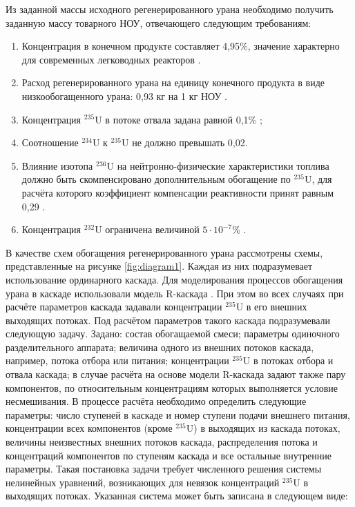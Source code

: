 Из заданной массы исходного регенерированного урана необходимо получить заданную массу товарного НОУ, отвечающего следующим требованиям:

\begin{enumerate}
  \item Концентрация в конечном продукте составляет 4,95\%, значение характерно для современных легководных реакторов \cite{solovevaCennostiOYaTKak2019}.
  \item Расход регенерированного урана на единицу конечного продукта в виде низкообогащенного урана: 0,93 кг на 1 кг НОУ \cite{smirnovApplyingEnrichmentCapacities2018}.
  \item Концентрация $^{235}$U в потоке отвала задана равной 0,1\% \cite{smirnovEvolutionIsotopicComposition2012};
  \item Соотношение $^{234}$U к $^{235}$U не должно превышать 0,02.
  \item Влияние изотопа $^{236}$U на нейтронно-физические характеристики топлива должно быть скомпенсировано дополнительным обогащение по $^{235}$U, для расчёта которого коэффициент компенсации реактивности принят равным 0,29 \cite{smirnovApplyingEnrichmentCapacities2018}.
  \item Концентрация $^{232}$U ограничена величиной $5\cdot10^{-7}$\% \cite{smirnovApplyingEnrichmentCapacities2018}.
\end{enumerate}

В качестве схем обогащения регенерированного урана рассмотрены схемы, представленные на рисунке \ref{fig:diagram1}.
Каждая из них подразумевает использование ординарного каскада. Для моделирования процессов обогащения урана в каскаде использовали модель R-каскада \cite{sulaberidzeTeoriyaKaskadovDlya2011}. При этом во всех случаях при расчёте параметров каскада задавали концентрации $^{235}$U в его внешних выходящих потоках. Под расчётом параметров такого каскада подразумевали следующую задачу. 
Задано: состав обогащаемой смеси; параметры одиночного разделительного аппарата; величина одного из внешних потоков каскада, например, потока отбора или питания; концентрации $^{235}$U в потоках отбора и отвала каскада; в случае расчёта на основе модели R-каскада задают также пару компонентов, по относительным концентрациям которых выполняется условие несмешивания.
В процессе расчёта необходимо определить следующие параметры: число ступеней в каскаде и номер ступени подачи внешнего питания, концентрации всех компонентов (кроме $^{235}$U) в выходящих из каскада потоках, величины неизвестных внешних потоков каскада, распределения потока и концентраций компонентов по ступеням каскада и все остальные внутренние параметры. 
Такая постановка задачи требует численного решения системы нелинейных уравнений, возникающих для невязок концентраций $^{235}$U в выходящих потоках. Указанная система может быть записана в следующем виде: 

